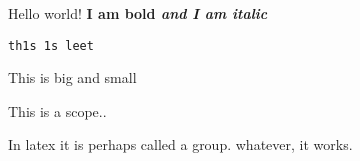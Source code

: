\documentclass{article}
\begin{document}
Hello world!
\bf I am bold \it and I am italic

\tt th1s 1s leet

\Large This is big
\small and small

{\sf
This is a scope..

In latex it is perhaps called a group. whatever, it works.
}
\end{document}
